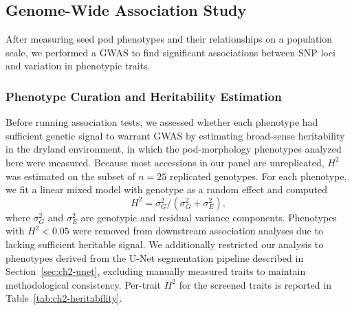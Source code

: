 \subsection{Genome-Wide Association Study}\label{sec:ch2-gwas}
After measuring seed pod phenotypes and their relationships on a population scale, we performed a GWAS to find significant associations between SNP loci and variation in phenotypic traits.

\subsubsection{Phenotype Curation and Heritability Estimation}\label{sec:ch2-heritability}
Before running association tests, we assessed whether each phenotype had sufficient genetic signal to warrant GWAS by estimating broad-sense heritability in the dryland environment, in which the pod-morphology phenotypes analyzed here were measured. Because most accessions in our panel are unreplicated, $H^2$ was estimated on the subset of $n=25$ replicated genotypes. For each phenotype, we fit a linear mixed model with genotype as a random effect and computed
\[
H^2 = \sigma^2_G / (\sigma^2_G + \sigma^2_E),
\]
where $\sigma^2_G$ and $\sigma^2_E$ are genotypic and residual variance components. Phenotypes with $H^2 < 0.05$ were removed from downstream association analyses due to lacking sufficient heritable signal. We additionally restricted our analysis to phenotypes derived from the U-Net segmentation pipeline described in Section~\ref{sec:ch2-unet}, excluding manually measured traits to maintain methodological consistency. Per-trait $H^2$ for the screened traits is reported in Table~\ref{tab:ch2-heritability}.


